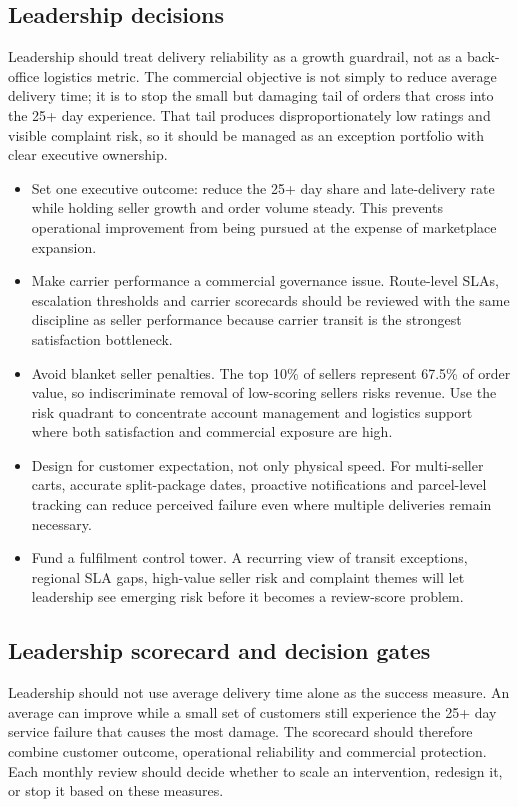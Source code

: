 \documentclass[11pt,a4paper]{article}
\begin{document}
\subsection{Leadership decisions}
Leadership should treat delivery reliability as a growth guardrail, not as a back-office logistics metric. The commercial objective is not simply to reduce average delivery time; it is to stop the small but damaging tail of orders that cross into the 25+ day experience. That tail produces disproportionately low ratings and visible complaint risk, so it should be managed as an exception portfolio with clear executive ownership.

\begin{itemize}[leftmargin=1.2cm]
    \item Set one executive outcome: reduce the 25+ day share and late-delivery rate while holding seller growth and order volume steady. This prevents operational improvement from being pursued at the expense of marketplace expansion.
    \item Make carrier performance a commercial governance issue. Route-level SLAs, escalation thresholds and carrier scorecards should be reviewed with the same discipline as seller performance because carrier transit is the strongest satisfaction bottleneck.
    \item Avoid blanket seller penalties. The top 10\% of sellers represent 67.5\% of order value, so indiscriminate removal of low-scoring sellers risks revenue. Use the risk quadrant to concentrate account management and logistics support where both satisfaction and commercial exposure are high.
    \item Design for customer expectation, not only physical speed. For multi-seller carts, accurate split-package dates, proactive notifications and parcel-level tracking can reduce perceived failure even where multiple deliveries remain necessary.
    \item Fund a fulfilment control tower. A recurring view of transit exceptions, regional SLA gaps, high-value seller risk and complaint themes will let leadership see emerging risk before it becomes a review-score problem.
\end{itemize}

\subsection{Leadership scorecard and decision gates}
Leadership should not use average delivery time alone as the success measure. An average can improve while a small set of customers still experience the 25+ day service failure that causes the most damage. The scorecard should therefore combine customer outcome, operational reliability and commercial protection. Each monthly review should decide whether to scale an intervention, redesign it, or stop it based on these measures.
\end{document}

